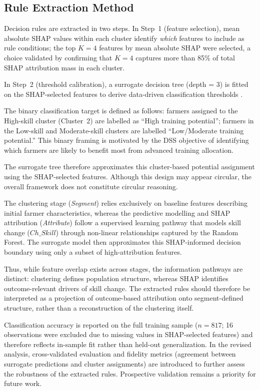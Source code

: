 \documentclass[3p,twocolumn,authoryear]{elsarticle}
\begin{document}
\subsection{Rule Extraction Method}

Decision rules are extracted in two steps.
In Step~1 (feature selection), mean absolute SHAP values within each
cluster identify \textit{which} features to include as rule conditions;
the top $K = 4$ features by mean absolute SHAP were selected, a choice
validated by confirming that $K = 4$ captures more than 85\% of total
SHAP attribution mass in each cluster.

In Step~2 (threshold calibration), a surrogate decision tree (depth = 3)
is fitted on the SHAP-selected features to derive data-driven
classification thresholds \citep{guidotti2019,molnar2022}.

The binary classification target is defined as follows: farmers assigned
to the High-skill cluster (Cluster~2) are labelled as ``High training
potential''; farmers in the Low-skill and Moderate-skill clusters are
labelled ``Low/Moderate training potential.''
This binary framing is motivated by the DSS objective of identifying
which farmers are likely to benefit most from advanced training
allocation.

The surrogate tree therefore approximates this cluster-based potential
assignment using the SHAP-selected features. 
Although this design may appear circular, the overall framework does not
constitute circular reasoning. 

The clustering stage (\textit{Segment}) relies exclusively on baseline
features describing initial farmer characteristics, whereas the
predictive modelling and SHAP attribution (\textit{Attribute}) follow a
supervised learning pathway that models skill change ($Ch\_Skill$)
through non-linear relationships captured by the Random Forest. 
The surrogate model then approximates this SHAP-informed decision boundary
using only a subset of high-attribution features.

Thus, while feature overlap exists across stages, the information
pathways are distinct: clustering defines population structure, whereas
SHAP identifies outcome-relevant drivers of skill change. 
The extracted rules should therefore be interpreted as a projection of
outcome-based attribution onto segment-defined structure, rather than a
reconstruction of the clustering itself.

Classification accuracy is reported on the full training sample
($n = 817$; 16 observations were excluded due to missing values in
SHAP-selected features) and therefore reflects in-sample fit rather
than held-out generalization. 
In the revised analysis, cross-validated evaluation and fidelity metrics
(agreement between surrogate predictions and cluster assignments) are
introduced to further assess the robustness of the extracted rules. 
Prospective validation remains a priority for future work.
\end{document}
